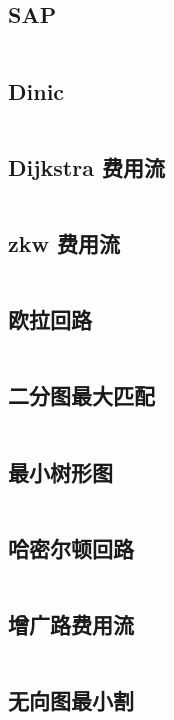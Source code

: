 \documentclass[titlepage,landscape,a4paper,10pt]{article}
\begin{document}
\begin{multicols}{2}
\begin{spacing}{0.8}
\subsection{SAP}
\inputminted{cpp}{Graph/SAP.cpp}

\subsection{Dinic}
\inputminted{cpp}{Graph/dinic.cpp}

\subsection{Dijkstra 费用流}
\inputminted{cpp}{Graph/MinCostFlow.cpp}

\subsection{zkw 费用流}
\inputminted{cpp}{Graph/zkw费用流.cpp}

\subsection{欧拉回路}
\inputminted{cpp}{Graph/欧拉回路.cpp}

\subsection{二分图最大匹配}
\inputminted{cpp}{Graph/匈牙利算法.cpp}

\subsection{最小树形图}
\inputminted{cpp}{Graph/最小树形图.cpp}

\subsection{哈密尔顿回路}
\inputminted{cpp}{Graph/哈密尔顿回路.cpp}

\subsection{增广路费用流}
\inputminted{cpp}{Graph/增广路费用流.cpp}

\subsection{无向图最小割}
\inputminted{cpp}{Graph/无向图最小割.cpp}


\end{spacing}
\end{multicols}
\end{document}
